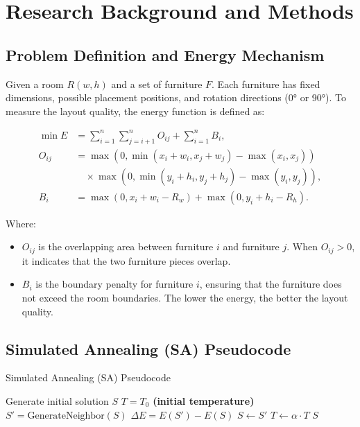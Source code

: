 \documentclass[conference]{IEEEtran}
\begin{document}
\section{Research Background and Methods}
\subsection{Problem Definition and Energy Mechanism}
Given a room \( R(w,h) \) and a set of furniture \( F \). Each furniture has fixed dimensions, possible placement positions, and rotation directions (0° or 90°). To measure the layout quality, the energy function is defined as:

\begin{align}
\min E &= \sum_{i=1}^{n}\sum_{j=i+1}^{n} O_{ij} + \sum_{i=1}^{n} B_i, \label{eq:energy} \\
O_{ij} &= \max\left(0, \min(x_i + w_i, x_j + w_j) - \max(x_i, x_j)\right) \nonumber \\
&\quad \times \max\left(0, \min(y_i + h_i, y_j + h_j) - \max(y_i, y_j)\right), \label{eq:overlap} \\
B_i &= \max\left(0, x_i + w_i - R_w\right) + \max\left(0, y_i + h_i - R_h\right). \label{eq:boundary}
\end{align}

Where:
\begin{itemize}
    \item \( O_{ij} \) is the overlapping area between furniture \( i \) and furniture \( j \). When \( O_{ij} > 0 \), it indicates that the two furniture pieces overlap.
    \item \( B_i \) is the boundary penalty for furniture \( i \), ensuring that the furniture does not exceed the room boundaries. The lower the energy, the better the layout quality.
\end{itemize}

\subsection{Simulated Annealing (SA) Pseudocode}
{\small
\begin{algorithm}[!htbp]
\caption{Simulated Annealing (SA) Pseudocode}
\begin{algorithmic}[1]
\STATE Generate initial solution \( S \)
\STATE \( T = T_0 \) \textbf{(initial temperature)}
        \STATE \( S' = \text{GenerateNeighbor}(S) \)
        \STATE \( \Delta E = E(S') - E(S) \)
            \STATE \( S \leftarrow S' \)
        \ENDIF
    \ENDFOR
    \STATE \( T \leftarrow \alpha \cdot T \)
\ENDWHILE
\RETURN \( S \)
\end{algorithmic}
\end{algorithm}
}
\end{document}
